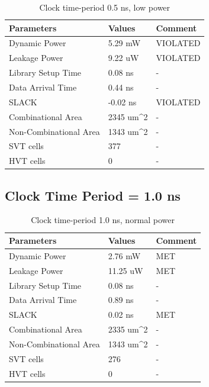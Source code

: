 \documentclass[11pt,a4paper]{article}
\begin{document}
\begin{table}[htbp]
\begin{center}
\begin{tabular}{|l|l|l|}
\hline
\textbf{Parameters}	& \textbf{Values}		& \textbf{Comment}\\ \hline
Dynamic Power				&	5.29 mW				& VIOLATED\\ \hline
Leakage Power 			&	9.22 uW				& VIOLATED\\ \hline
Library Setup Time  & 0.08 ns				& - \\ \hline
Data Arrival Time		& 0.44 ns				& - \\ \hline
SLACK								& -0.02 ns			& VIOLATED \\ \hline
Combinational Area	& 2345 um^2			& - \\ \hline
Non-Combinational Area	& 1343 um^2	& - \\ \hline
SVT cells						& 377						& - \\ \hline
HVT cells						& 0							& - \\ \hline
\end{tabular}
\end{center}
\caption{Clock time-period 0.5 ns, low power}
\label{tab:syn0.5.2}
\end{table}

\newpage
\subsection{Clock Time Period = 1.0 ns}
\begin{table}[htbp]
\begin{center}
\begin{tabular}{|l|l|l|}
\hline
\textbf{Parameters}	& \textbf{Values}		& \textbf{Comment}\\ \hline
Dynamic Power				&	2.76 mW				& MET\\ \hline
Leakage Power 			&	11.25 uW			& MET\\ \hline
Library Setup Time  & 0.08 ns				& - \\ \hline
Data Arrival Time		& 0.89 ns				& - \\ \hline
SLACK								& 0.02 ns				& MET\\ \hline
Combinational Area	& 2335 um^2			& - \\ \hline
Non-Combinational Area	& 1343 um^2	& - \\ \hline
SVT cells						& 276						& - \\ \hline
HVT cells						& 0							& - \\ \hline
\end{tabular}
\end{center}
\caption{Clock time-period 1.0 ns, normal power}
\label{tab:syn1.0.1}
\end{table}
\end{document}

